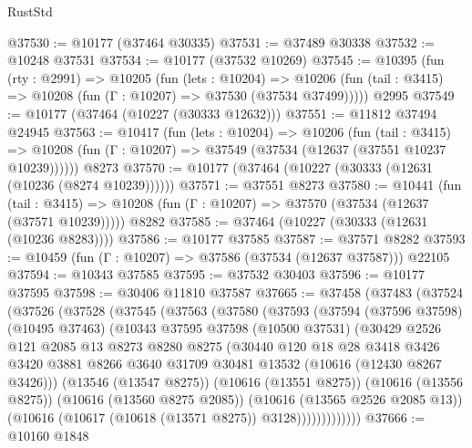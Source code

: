 \begin{lexlean}{RustStd}
\begin{coremodule}
@37530 := @10177 (@37464 @30335)
@37531 := @37489 @30338
@37532 := @10248 @37531
@37534 := @10177 (@37532 @10269)
@37545 := @10395
    (fun (rty : @2991) =>
    @10205
      (fun (lets : @10204) =>
      @10206 (fun (tail : @3415) => @10208 (fun (Γ : @10207) => @37530 (@37534 @37499)))))
    @2995
@37549 := @10177 (@37464 (@10227 (@30333 @12632)))
@37551 := @11812 @37494 @24945
@37563 := @10417
    (fun (lets : @10204) =>
    @10206
      (fun (tail : @3415) =>
      @10208 (fun (Γ : @10207) => @37549 (@37534 (@12637 (@37551 @10237 @10239))))))
    @8273
@37570 := @10177 (@37464 (@10227 (@30333 (@12631 (@10236 (@8274 @10239))))))
@37571 := @37551 @8273
@37580 := @10441
    (fun (tail : @3415) => @10208 (fun (Γ : @10207) => @37570 (@37534 (@12637 (@37571 @10239)))))
    @8282
@37585 := @37464 (@10227 (@30333 (@12631 (@10236 @8283))))
@37586 := @10177 @37585
@37587 := @37571 @8282
@37593 := @10459 (fun (Γ : @10207) => @37586 (@37534 (@12637 @37587))) @22105
@37594 := @10343 @37585
@37595 := @37532 @30403
@37596 := @10177 @37595
@37598 := @30406 @11810 @37587
@37665 := @37458
    (@37483
      (@37524
        (@37526
          (@37528
            (@37545
              (@37563
                (@37580
                  (@37593
                    (@37594
                      (@37596 @37598)
                      (@10495 @37463)
                      (@10343
                        @37595
                        @37598
                        (@10500 @37531)
                        (@30429
                          @2526
                          @121
                          @2085
                          @13
                          @8273
                          @8280
                          @8275
                          (@30440
                            @120
                            @18
                            @28
                            @3418
                            @3426
                            @3420
                            @3881
                            @8266
                            @3640
                            @31709
                            @30481
                            @13532
                            (@10616 (@12430 @8267 @3426)))
                          (@13546 (@13547 @8275))
                          (@10616 (@13551 @8275))
                          (@10616 (@13556 @8275))
                          (@10616 (@13560 @8275 @2085))
                          (@10616 (@13565 @2526 @2085 @13))
                          (@10616 (@10617 (@10618 (@13571 @8275)) @3128)))))))))))))
@37666 := @10160 @1848

\end{coremodule}
\end{lexlean}
